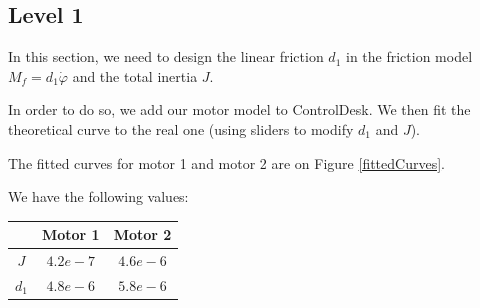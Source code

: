 \subsection*{Level 1}

In this section, we need to design the linear friction $d_1$ in the friction model $M_f = d_1 \dot{\varphi}$ and the total inertia $J$.


In order to do so, we add our motor model to ControlDesk. We then fit the theoretical curve to the real one (using sliders to modify $d_1$ and $J$). 

The fitted curves for motor 1 and motor 2 are on Figure \ref{fittedCurves}. 


We have the following values:

\begin{center}
\begin{tabular}{|c|c|c|}
 \hline
 & Motor 1 & Motor 2 \\
 \hline 
 $J$ & $4.2e-7$ & $4.6e-6$ \\ 
 \hline 
 $d_1$ & $4.8e-6$ & $5.8e-6$  \\
 \hline
\end{tabular}
\end{center}


